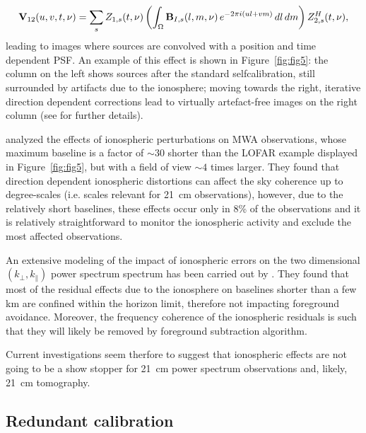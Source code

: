 \begin{itemize}
\begin{equation}
{\bf V}_{12} (u,v,t,\nu) = \sum_s Z_{1,s} (t, \nu) \left ( \int_\Omega {\bf B}_{I,s} (l, m, \nu) \, e^{-2 \pi i (ul + vm)} \,  dl \, dm \right ) Z_{2,s}^H (t, \nu),
\label{eq:sec:12}
\end{equation}
leading to images where sources are convolved with a position and time dependent PSF. An example of this effect is shown in Figure~\ref{fig:fig5}: the column on the left shows sources after the standard selfcalibration, still surrounded by artifacts due to the ionosphere; moving towards the right,  iterative direction dependent corrections lead to virtually artefact-free images on the right column (see \cite{vanweeren16} for further details). 

\cite{trott17b} analyzed the effects of ionospheric perturbations on MWA observations, whose maximum baseline is a factor of $\sim 30$ shorter than the LOFAR example displayed in Figure~\ref{fig:fig5}, but with a field of view $\sim 4$ times larger. They found that direction dependent ionospheric distortions can affect the sky coherence up to degree-scales (i.e. scales relevant for 21~cm observations), however, due to the relatively short baselines, these effects occur only in 8\% of the observations and it is relatively straightforward to monitor the ionospheric activity and exclude the most affected observations.

An extensive modeling of the impact of ionospheric errors on the two dimensional $(k_\perp,k_\parallel)$ power spectrum spectrum has been carried out by \cite{vedantham16}. They found that most of the residual effects due to the ionosphere on baselines shorter than a few km are confined within the horizon limit, therefore not impacting foreground avoidance. Moreover, the frequency coherence of the ionospheric residuals is such that they will likely be removed by foreground subtraction algorithm.

Current investigations seem therfore to suggest that ionospheric effects are not going to be a show stopper for 21~cm power spectrum observations and, likely, 21~cm tomography. 
\end{itemize}





\subsection{Redundant calibration}

